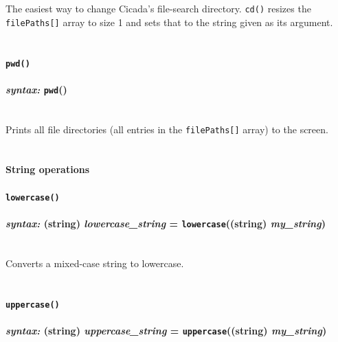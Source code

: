 \documentclass{article}
\begin{document}
The easiest way to change Cicada's file-search directory.  \verb#cd()# resizes the \verb#filePaths[]# array to size 1 and sets that to the string given as its argument.\\\\


\paragraph{\texttt{pwd()}\\\\
\normalfont \emph{syntax: } \texttt{pwd}()\\\\}

Prints all file directories (all entries in the \verb#filePaths[]# array) to the screen.\\\\




\paragraph{String operations}


\paragraph{\texttt{lowercase()}\\\\
\normalfont \emph{syntax: } (string) \emph{lowercase\_string} = \texttt{lowercase}((string) \emph{my\_string})\\\\}

Converts a mixed-case string to lowercase.\\\\


\paragraph{\texttt{uppercase()}\\\\
\normalfont \emph{syntax: } (string) \emph{uppercase\_string} = \texttt{uppercase}((string) \emph{my\_string})\\\\}
\end{document}
